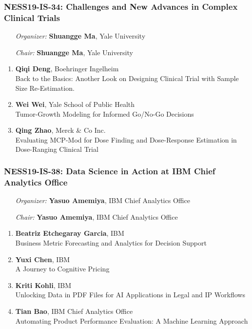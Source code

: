 \subsubsection*{NESS19-IS-34: Challenges and New Advances in Complex Clinical Trials}

\begin{enumerate}[align=left]
\item [\emph{Organizer:}] \textbf{Shuangge Ma}, Yale University
\item [\emph{Chair:}] \textbf{Shuangge Ma}, Yale University
\end{enumerate}

\begin{enumerate}
\item \textbf{Qiqi Deng}, Boehringer Ingelheim \\
Back to the Basics: Another Look on Designing Clinical Trial with Sample Size Re-Estimation.
\item \textbf{Wei Wei}, Yale School of Public Health \\
Tumor-Growth Modeling for Informed Go/No-Go Decisions
\item \textbf{Qing Zhao}, Merck \& Co Inc. \\
Evaluating MCP-Mod for Dose Finding and Dose-Response Estimation in Dose-Ranging Clinical Trial
\end{enumerate}

\subsubsection*{NESS19-IS-38: Data Science in Action at IBM Chief Analytics Office}

\begin{enumerate}[align=left]
\item [\emph{Organizer:}] \textbf{Yasuo Amemiya}, IBM Chief Analytics Office
\item [\emph{Chair:}] \textbf{Yasuo Amemiya}, IBM Chief Analytics Office
\end{enumerate}

\begin{enumerate}
\item \textbf{Beatriz Etchegaray Garcia}, IBM \\
Business Metric Forecasting and Analytics for Decision Support
\item \textbf{Yuxi Chen}, IBM \\
A Journey to Cognitive Pricing
\item \textbf{Kriti Kohli}, IBM \\
Unlocking Data in PDF Files for AI Applications in Legal and IP Workflows
\item \textbf{Tian Bao}, IBM Chief Analytics Office \\
Automating Product Performance Evaluation: A Machine Learning Approach
\end{enumerate}

